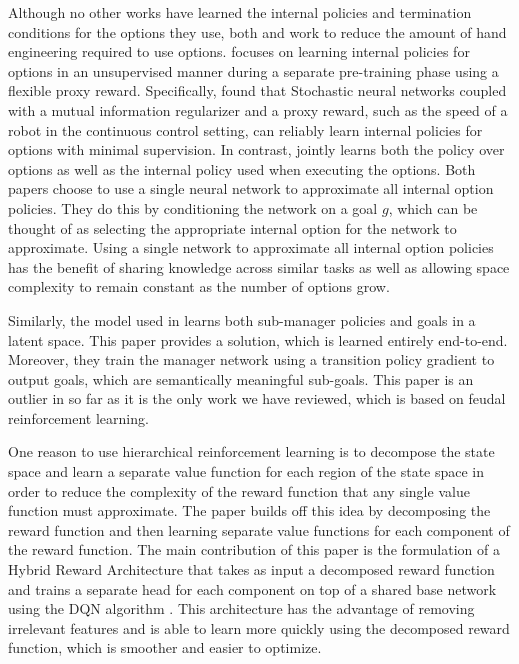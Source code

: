 Although no other works have learned the internal policies and termination conditions
for the options they use, both \cite{Tejas} and
\cite{Florensa} work to reduce the amount of hand engineering required
to use options. \cite{Florensa} focuses on learning internal policies for options in an unsupervised manner
during a separate pre-training phase using a flexible proxy reward.
Specifically, \cite{Florensa} found that Stochastic neural networks coupled with
a mutual information regularizer and a proxy reward, such as the speed of a
robot in the continuous control setting, can reliably learn internal policies for
options with minimal supervision. In contrast,
\cite{Tejas} jointly learns both the policy over options
as well as the internal policy used when executing the options. Both papers choose to
use a single neural network to approximate all internal option policies. They do this
by conditioning the network on a goal $g$, which can be thought of as selecting the
appropriate internal option for the network to approximate. Using a single network
to approximate all internal option policies has the benefit of sharing knowledge
across similar tasks as well as allowing space complexity to remain constant as
the number of options grow.

Similarly, the model used in \cite{Vezhnevets} learns both sub-manager policies and
goals in a latent space. This paper provides a solution, which is learned entirely
end-to-end. Moreover, they train the manager network using a transition
policy gradient to output goals, which are semantically meaningful sub-goals.
This paper is an outlier in so far as it is the only work we have
reviewed, which is based on feudal reinforcement learning.

One reason to use hierarchical reinforcement learning is
to decompose the state space and learn a separate value function
for each region of the state space in order to reduce the complexity of the reward
function that any single value function must approximate. The paper
\cite{Seijen} builds off this idea
by decomposing the reward function and then learning separate value functions for
each component of the reward function. The main contribution of this paper is
the formulation of a Hybrid Reward Architecture that takes as input a decomposed
reward function and trains a separate head for each component on top of a shared base
network using the DQN algorithm \cite{Mnih}. This architecture has the advantage of
removing irrelevant features and is able to learn more quickly using the decomposed
reward function, which is smoother and easier to optimize.

